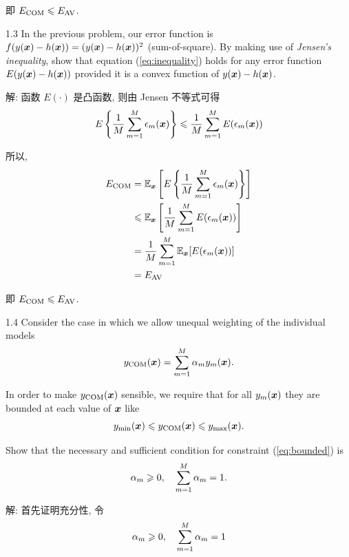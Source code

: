 \documentclass{article}
\begin{document}
即 $E_{\text{COM}}\leqslant E_{\text{AV}}$.

1.3 In the previous problem, our error function is $f(y(\bm{x})-h(\bm{x}))=(y(\bm{x})-h(\bm{x}))^{2}$ (sum-of-square). By making use of \emph{Jensen's inequality}, show that equation (\ref{eq:inequality}) holds for any error function $E(y(\bm{x})-h(\bm{x}))$ provided it is a convex function of $y(\bm{x})-h(\bm{x})$.

解: 函数 $E(\cdot)$ 是凸函数, 则由 Jensen 不等式可得
\begin{equation}
  E\left\{\frac{1}{M}\sum_{m=1}^{M}\epsilon_{m}(\bm{x})\right\}
  \leqslant
  \frac{1}{M}\sum_{m=1}^{M}E(\epsilon_{m}(\bm{x}))
\end{equation}

所以,
\begin{equation}
  \begin{aligned}
    E_{\text{COM}}
    &=\mathbb{E}_{\bm{x}}\left[E\left\{\frac{1}{M}\sum_{m=1}^{M}\epsilon_{m}(\bm{x})\right\}\right]\\
    &\leqslant\mathbb{E}_{\bm{x}}\left[\frac{1}{M}\sum_{m=1}^{M}E(\epsilon_{m}(\bm{x}))\right]\\
    &=\frac{1}{M}\sum_{m=1}^{M}\mathbb{E}_{\bm{x}}[E(\epsilon_{m}(\bm{x}))]\\
    &=E_{\text{AV}}
  \end{aligned}
\end{equation}

即 $E_{\text{COM}}\leqslant E_{\text{AV}}$.

1.4 Consider the case in which we allow unequal weighting of the individual models
\begin{equation}
  y_{\text{COM}}(\bm{x})=\sum_{m=1}^{M}\alpha_{m}y_{m}(\bm{x}).
\end{equation}

In order to make $y_{\text{COM}}(\bm{x})$ sensible, we require that for all $y_{m}(\bm{x})$ they are bounded at each value of $\bm{x}$ like
\begin{equation}
  y_{\min}(\bm{x})\leqslant y_{\text{COM}}(\bm{x})\leqslant y_{\max}(\bm{x}).
  \label{eq:bounded}
\end{equation}

Show that the necessary and sufficient condition for constraint (\ref{eq:bounded}) is
\begin{equation}
  \alpha_{m}\geqslant 0,\quad\sum_{m=1}^{M}\alpha_{m}=1.
\end{equation}

解: 首先证明充分性, 令
\begin{equation}
  \alpha_{m}\geqslant 0,\quad\sum_{m=1}^{M}\alpha_{m}=1
\end{equation}
\end{document}
